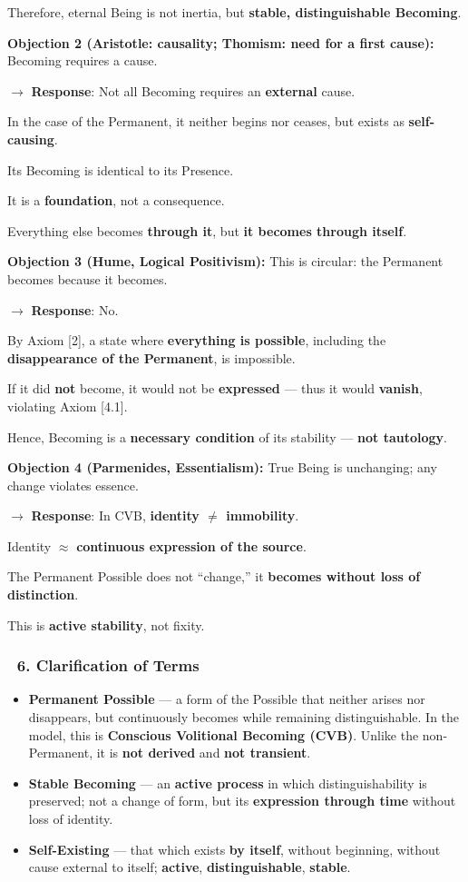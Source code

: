 \documentclass[12pt]{article}
\begin{document}
Therefore, eternal Being is not inertia, but \textbf{stable, distinguishable Becoming}.

\bigskip
\textbf{Objection 2 (Aristotle: causality; Thomism: need for a first cause):}  
Becoming requires a cause.

$\rightarrow$ \textbf{Response}:  
Not all Becoming requires an \textbf{external} cause.

In the case of the Permanent, it neither begins nor ceases, but exists as \textbf{self-causing}.

Its Becoming is identical to its Presence.

It is a \textbf{foundation}, not a consequence.

Everything else becomes \textbf{through it}, but \textbf{it becomes through itself}.

\bigskip
\textbf{Objection 3 (Hume, Logical Positivism):}  
This is circular: the Permanent becomes because it becomes.

$\rightarrow$ \textbf{Response}:  
No.

By Axiom [2], a state where \textbf{everything is possible}, including the \textbf{disappearance of the Permanent}, is impossible.

If it did \textbf{not} become, it would not be \textbf{expressed} — thus it would \textbf{vanish}, violating Axiom [4.1].

Hence, Becoming is a \textbf{necessary condition} of its stability — \textbf{not tautology}.

\bigskip
\textbf{Objection 4 (Parmenides, Essentialism):}  
True Being is unchanging; any change violates essence.

$\rightarrow$ \textbf{Response}:  
In CVB, \textbf{identity $\neq$ immobility}.

Identity $\approx$ \textbf{continuous expression of the source}.

The Permanent Possible does not ``change,'' it \textbf{becomes without loss of distinction}.

This is \textbf{active stability}, not fixity.

\subsubsection*{🔹 6. Clarification of Terms}
\begin{itemize}
\item \textbf{Permanent Possible} — a form of the Possible that neither arises nor disappears, but continuously becomes while remaining distinguishable. In the model, this is \textbf{Conscious Volitional Becoming (CVB)}. Unlike the non-Permanent, it is \textbf{not derived} and \textbf{not transient}.
\item \textbf{Stable Becoming} — an \textbf{active process} in which distinguishability is preserved; not a change of form, but its \textbf{expression through time} without loss of identity.
\item \textbf{Self-Existing} — that which exists \textbf{by itself}, without beginning, without cause external to itself; \textbf{active}, \textbf{distinguishable}, \textbf{stable}.
\end{itemize}
\end{document}
